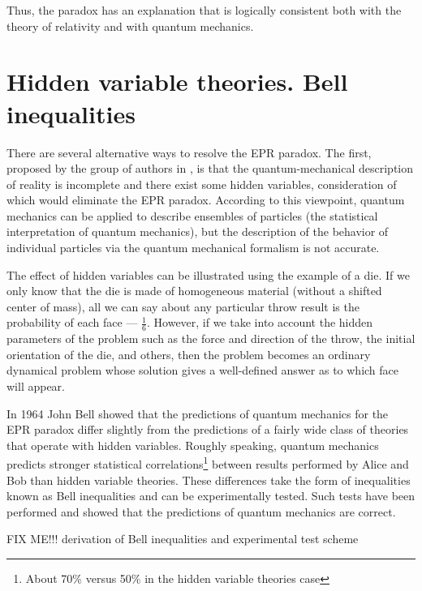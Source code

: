 Thus, the paradox has an explanation that is logically consistent both with the theory of relativity and with quantum mechanics.

\section{Hidden variable theories. Bell inequalities}
There are several alternative ways to resolve the EPR paradox. The first, proposed by the group of authors in
\cite{bEPR}, is that the quantum-mechanical description of reality is incomplete and there exist some hidden variables,
consideration of which would eliminate the EPR paradox. According to this viewpoint,
quantum mechanics can be applied to describe ensembles of particles (the statistical interpretation of quantum mechanics),
but the description of the behavior of individual particles via the quantum mechanical formalism is not accurate. 

The effect of hidden variables can be illustrated using the example of a die. If we only know that the die is made of homogeneous material (without a shifted center of mass),
all we can say about any particular throw result is the probability of each face — $\frac{1}{6}$. However, if we take into account
the hidden parameters of the problem such as the force and direction of the throw, the initial orientation of the die, and others, then the problem becomes
an ordinary dynamical problem whose solution gives a well-defined answer as to which face will appear.

In 1964 John Bell showed \cite{bBell} that the predictions of quantum mechanics for the EPR paradox differ slightly from the
predictions of a fairly wide class of theories that operate with hidden variables. Roughly speaking, quantum mechanics
predicts stronger statistical correlations\footnote{About 70\% versus 50\% in the hidden variable theories case}
between results performed by Alice and Bob
than hidden variable theories. These differences take the form of inequalities known as Bell inequalities and can be experimentally tested.
Such tests have been performed \cite{bBellTest} and showed that the predictions of quantum mechanics are correct. 

FIX ME!!! derivation of Bell inequalities and experimental test scheme



